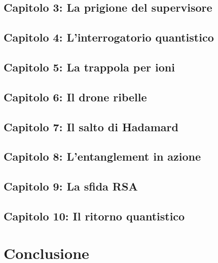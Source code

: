 \documentclass[a4paper,12pt]{book}
\begin{document}
\section{Capitolo 3: La prigione del supervisore}


\section{Capitolo 4: L'interrogatorio quantistico}


\section{Capitolo 5: La trappola per ioni}


\section{Capitolo 6: Il drone ribelle}


\section{Capitolo 7: Il salto di Hadamard}


\section{Capitolo 8: L'entanglement in azione}


\section{Capitolo 9: La sfida RSA}


\section{Capitolo 10: Il ritorno quantistico}


\chapter*{Conclusione}
\end{document}
